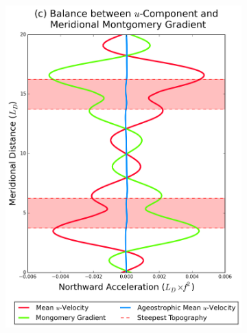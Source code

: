 \documentclass[12pt,a4paper]{report}
\begin{document}
\begin{figure}
\begin{subfigure}{0.46\linewidth}
 		\includegraphics[width=\linewidth ]{vgeo_1}
 		\label{fig:vgeolayer1}
 	\end{subfigure}
 	\quad
 	\begin{subfigure}{0.46\linewidth}
 		\centering

\end{subfigure}
\end{figure}
\end{document}
